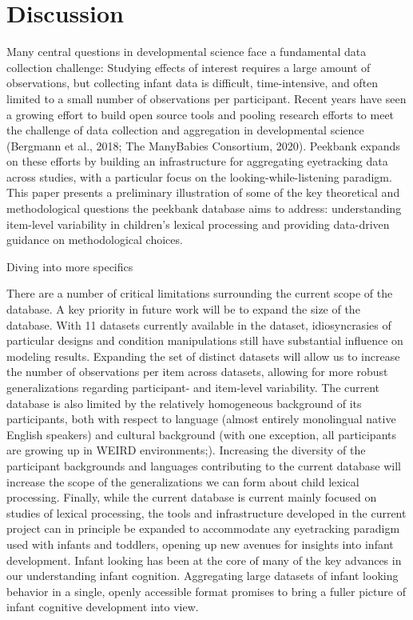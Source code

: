 \documentclass[10pt, letterpaper]{article}
\begin{document}
\hypertarget{discussion}{%
\section{Discussion}\label{discussion}}

Many central questions in developmental science face a fundamental data
collection challenge: Studying effects of interest requires a large
amount of observations, but collecting infant data is difficult,
time-intensive, and often limited to a small number of observations per
participant. Recent years have seen a growing effort to build open
source tools and pooling research efforts to meet the challenge of data
collection and aggregation in developmental science (Bergmann et al.,
2018; The ManyBabies Consortium, 2020). Peekbank expands on these
efforts by building an infrastructure for aggregating eyetracking data
across studies, with a particular focus on the looking-while-listening
paradigm. This paper presents a preliminary illustration of some of the
key theoretical and methodological questions the peekbank database aims
to address: understanding item-level variability in children's lexical
processing and providing data-driven guidance on methodological choices.

Diving into more specifics

There are a number of critical limitations surrounding the current scope
of the database. A key priority in future work will be to expand the
size of the database. With 11 datasets currently available in the
dataset, idiosyncrasies of particular designs and condition
manipulations still have substantial influence on modeling results.
Expanding the set of distinct datasets will allow us to increase the
number of observations per item across datasets, allowing for more
robust generalizations regarding participant- and item-level
variability. The current database is also limited by the relatively
homogeneous background of its participants, both with respect to
language (almost entirely monolingual native English speakers) and
cultural background (with one exception, all participants are growing up
in WEIRD environments;). Increasing the diversity of the participant
backgrounds and languages contributing to the current database will
increase the scope of the generalizations we can form about child
lexical processing. Finally, while the current database is current
mainly focused on studies of lexical processing, the tools and
infrastructure developed in the current project can in principle be
expanded to accommodate any eyetracking paradigm used with infants and
toddlers, opening up new avenues for insights into infant development.
Infant looking has been at the core of many of the key advances in our
understanding infant cognition. Aggregating large datasets of infant
looking behavior in a single, openly accessible format promises to bring
a fuller picture of infant cognitive development into view.
\end{document}
